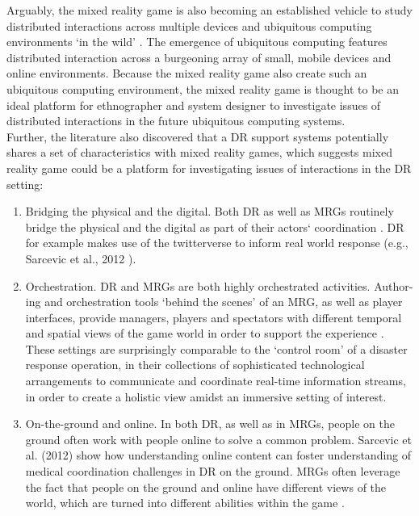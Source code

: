 Arguably, the mixed reality game is also becoming an established vehicle to study distributed interactions across multiple devices and ubiquitous computing environments `in the wild' \cite{Crabtree2006, Benford2005, Fischer2012}. The emergence of ubiquitous computing features distributed interaction across a burgeoning array of small, mobile devices and online environments. Because the mixed reality game also create such an ubiquitous computing environment,  the mixed reality game is thought to be an ideal platform for ethnographer and system designer to investigate issues of distributed interactions in the future ubiquitous computing systems.\\

Further, the literature \cite{Fischer2012} also discovered that a DR support systems potentially shares a set of characteristics with mixed reality games, which suggests mixed reality game could be a platform for investigating issues of interactions in the DR setting:\\

\begin{enumerate}
\item Bridging the physical and the digital. Both DR as well as \ac{MRG}s routinely bridge the physical and the digital as part of their actors` coordination \cite{Benford2005}. DR for example makes use of the twitterverse to inform real world response (e.g., Sarcevic et al., 2012 \cite{Sarcevic2012}).

\item Orchestration. \ac{DR} and \ac{MRG}s are both highly orchestrated activities. Author-ing and orchestration tools `behind the scenes' of an \ac{MRG}, as well as player interfaces, provide managers, players and spectators with different temporal and spatial views of the game world in order to support the experience \cite{Crabtree2004}. These settings are surprisingly comparable to the `control room' of a disaster response operation, in their collections of sophisticated technological arrangements to communicate and coordinate real-time information streams, in order to create a holistic view amidst an immersive setting of interest.\\

\item On-the-ground and online. In both \ac{DR}, as well as in \ac{MRG}s, people on the ground often work with people online to solve a common problem. Sarcevic et al. (2012)\cite{Sarcevic2012} show how understanding online content can foster understanding of medical coordination challenges in \ac{DR} on the ground. \ac{MRG}s often leverage the fact that people on the ground and online have different views of the world, which are turned into different abilities within the game \cite{Flintham2003}.\\ 

\end{enumerate}

